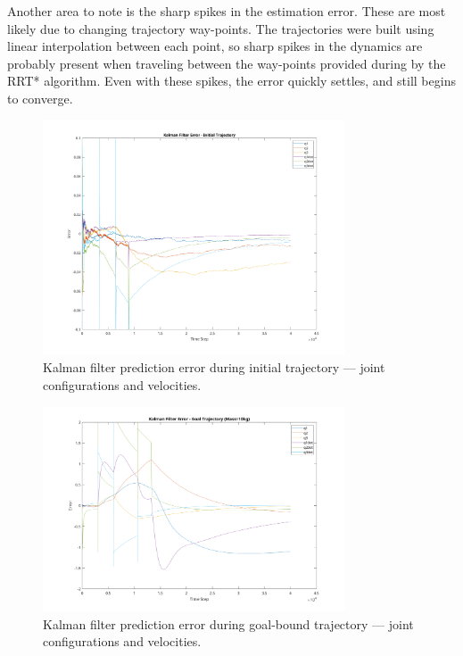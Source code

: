 Another area to note is the sharp spikes in the estimation error.
These are most likely due to changing trajectory way-points.
The trajectories were built using linear interpolation between each point, so sharp spikes in the dynamics are probably present when traveling between the way-points provided during by the RRT* algorithm.
Even with these spikes, the error quickly settles, and still begins to converge.

\begin{figure}[H]
  \centering
  \includegraphics[width=0.8\textwidth]{figures/kf_error_initial.png}
  \caption{Kalman filter prediction error during initial trajectory --- joint configurations and velocities.}
  \label{fig:kferror-initial}
\end{figure}

\begin{figure}[H]
  \centering
  \includegraphics[width=0.8\textwidth]{figures/kf_error_goal.png}
  \caption{Kalman filter prediction error during goal-bound trajectory --- joint configurations and velocities.}
  \label{fig:kferror-goal}
\end{figure}

